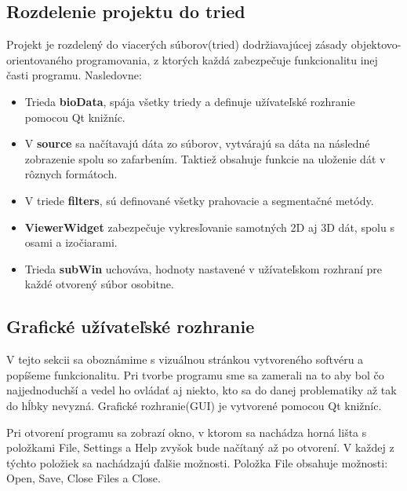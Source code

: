 \documentclass[a4paper,11pt,oneside]{article}%
\begin{document}
\subsection{Rozdelenie projektu do tried}

Projekt je rozdelený do viacerých súborov(tried) dodržiavajúcej zásady objektovo-orientovaného programovania, z ktorých každá zabezpečuje funkcionalitu inej časti programu. Nasledovne:

\begin{itemize}
\item Trieda \textbf{bioData}, spája všetky triedy a definuje užívateľské rozhranie pomocou Qt knižníc.
\item V \textbf{source} sa načítavajú dáta zo súborov, vytvárajú sa dáta na následné zobrazenie spolu so zafarbením. Taktiež obsahuje funkcie na uloženie dát v rôznych formátoch.    
\item V triede \textbf{filters}, sú definované všetky prahovacie a segmentačné metódy.
\item \textbf{ViewerWidget} zabezpečuje vykresľovanie samotných 2D aj 3D dát, spolu s osami a izočiarami. 
\item Trieda \textbf{subWin} uchováva, hodnoty nastavené v užívateľskom rozhraní pre každé otvorený súbor osobitne.

\end{itemize}


\subsection{Grafické užívateľské rozhranie}

V tejto sekcii sa oboznámime s vizuálnou stránkou vytvoreného softvéru a popíšeme funkcionalitu. Pri tvorbe programu sme sa zamerali na to aby bol čo najjednoduchší a vedel ho ovládať aj niekto, kto sa do danej problematiky až tak do hĺbky nevyzná. Grafické rozhranie(GUI) je vytvorené pomocou Qt knižníc.

Pri otvorení programu sa zobrazí okno, v ktorom sa nachádza horná lišta s položkami File, Settings a Help zvyšok bude načítaný až po otvorení. V každej z týchto položiek sa nachádzajú ďalšie možnosti. Položka File obsahuje možnosti: Open, Save, Close Files a Close.
\end{document}
